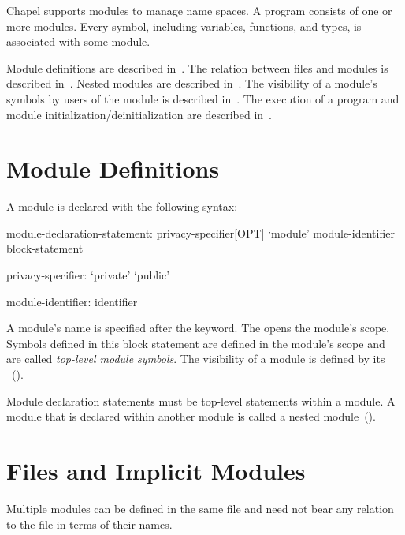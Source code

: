 \label{Modules}

Chapel supports modules to manage name spaces.  A program consists of
one or more modules.  Every symbol, including variables, functions,
and types, is associated with some module.

Module definitions are described in~.  The
relation between files and modules is described
in~.  Nested modules are described
in~.  The visibility of a module's symbols by
users of the module is described in~.  The execution
of a program and module initialization/deinitialization are described
in~.

\section{Module Definitions}
\label{Module_Definitions}

A module is declared with the following syntax:
\begin{syntax}
module-declaration-statement:
  privacy-specifier[OPT] `module' module-identifier block-statement

privacy-specifier:
  `private'
  `public'

module-identifier:
  identifier
\end{syntax}

A module's name is specified after the  keyword.
The  opens the module's scope.  Symbols defined
in this block statement are defined in the module's scope and are
called \emph{top-level module symbols}.  The visibility of a module is
defined by its ~().

Module declaration statements must be top-level statements within a
module.  A module that is declared within another module is called a
nested module~().

\section{Files and Implicit Modules}
\label{Implicit_Modules}

Multiple modules can be defined in the same file and need not bear any
relation to the file in terms of their names.

